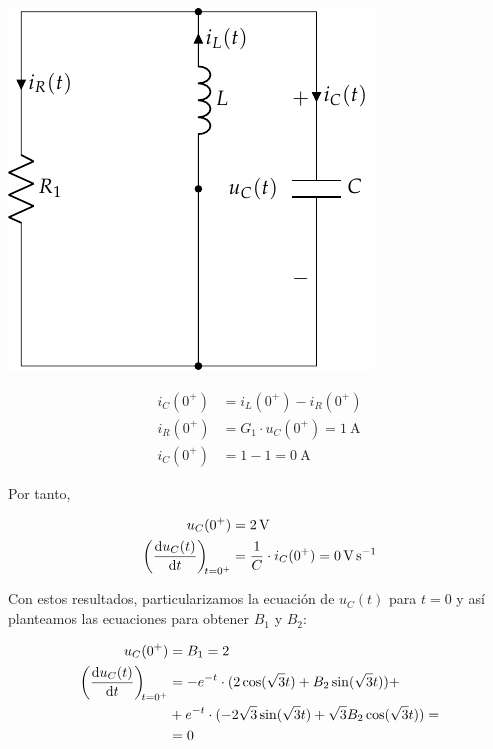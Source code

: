 \begin{minipage}{0.3\textwidth}
  \includegraphics[scale=0.8]{figuras/FM_4_9_natural}
\end{minipage}
\begin{minipage}{0.7\textwidth}
  \begin{align*}
    i_C(0^+) &= i_L(0^+) - i_R(0^+)\\
    i_R(0^+) &= G_1 \cdot u_C(0^+) = \SI{1}{\ampere}\\
    i_C(0^+) &= 1 - 1 = \SI{0}{\ampere}
  \end{align*}
\end{minipage}

\bigskip

Por tanto,

\begin{align*}
  u_C(0^+) &= \SI{2}{\volt}\\
  \diff{u_C(t)}{t}[t = 0^+] &= \frac{1}{C} \cdot i_C(0^+) = \SI{0}{\volt\per\second}
\end{align*}

Con estos resultados, particularizamos la ecuación de $u_C(t)$ para
$t = 0$ y así planteamos las ecuaciones para obtener $B_1$ y $B_2$:

\begin{align*}
  u_C(0^+) &= B_1 = 2\\
  \diff{u_C(t)}{t}[t = 0^+] &= -e^{-t} \cdot (2\cos(\sqrt{3}t) + B_2\sin(\sqrt{3}t)) +\\
           &+ e^{-t} \cdot (-2\sqrt{3}\sin(\sqrt{3}t) + \sqrt{3} B_2\cos(\sqrt{3}t)) =\\
           &= 0
\end{align*}


